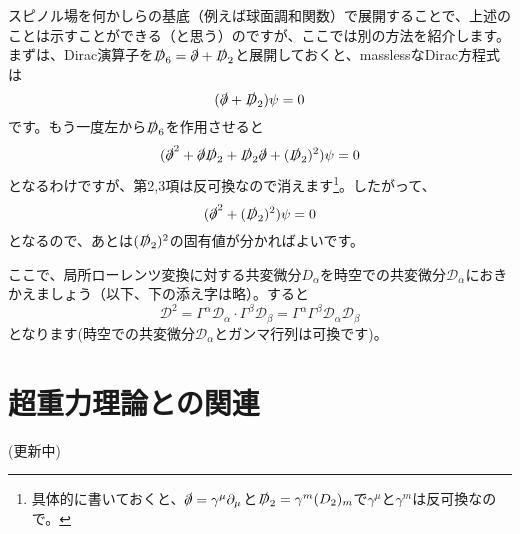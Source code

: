 \documentclass[unicode,a4paper,11pt]{ltjsarticle}
\begin{document}
スピノル場を何かしらの基底（例えば球面調和関数）で展開することで、上述のことは示すことができる（と思う）のですが、ここでは別の方法を紹介します。まずは、Dirac演算子を$\slashed{D}_{6}=\slashed{\partial}+\slashed{D}_{2}$と展開しておくと、masslessなDirac方程式は
\begin{equation}
   (\slashed{\partial}+\slashed{D}_{2})\psi
   =
   0
\end{equation}
です。もう一度左から$\slashed{D}_{6}$を作用させると
\begin{equation}
   (
      \slashed{\partial}^{2}
      +
      \slashed{\partial}\slashed{D}_{2}
      +
      \slashed{D}_{2}\slashed{\partial}
      +
      (\slashed{D}_{2})^{2}
   )\psi
   =
   0
\end{equation}
となるわけですが、第2,3項は反可換なので消えます\footnote{
   具体的に書いておくと、$\slashed{\partial}=\gamma^{\mu}\partial_{\mu}$と$\slashed{D}_{2}=\gamma^{m}(D_{2})_{m}$で$\gamma^{\mu}$と$\gamma^{m}$は反可換なので。
}。したがって、
\begin{equation}
   (
      \slashed{\partial}^{2}
      +
      (\slashed{D}_{2})^{2}
   )\psi
   =
   0   
\end{equation}
となるので、あとは$(\slashed{D}_{2})^{2}$の固有値が分かればよいです。

ここで、局所ローレンツ変換に対する共変微分$D_{\alpha}$を時空での共変微分$\mathcal{D}_{\alpha}$におきかえましょう（以下、下の添え字は略）。すると
\begin{equation}
   \mathcal{D}^2
   =
   \Gamma^{\alpha}\mathcal{D}_{\alpha}
   \cdot
   \Gamma^{\beta}\mathcal{D}_{\beta}
   =
   \Gamma^{\alpha}\Gamma^{\beta}
   \mathcal{D}_{\alpha}\mathcal{D}_{\beta}
\end{equation}
となります(時空での共変微分$\mathcal{D}_{\alpha}$とガンマ行列は可換です)。











\clearpage

\section{超重力理論との関連}

(更新中)
\end{document}
